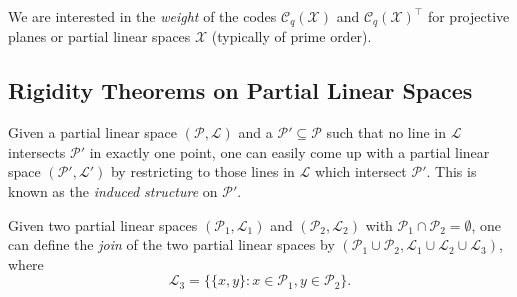 	We are interested in the \emph{weight} of the codes $\mathcal{C}_q(\mathcal{X})$ and $\mathcal{C}_q(\mathcal{X})^\top$ for projective planes or partial linear spaces $\mathcal{X}$ (typically of prime order).

\subsection{Rigidity Theorems on Partial Linear Spaces}

	\begin{fdef}
		Given a partial linear space $(\mathcal{P},\mathcal{L})$ and a $\mathcal{P}' \subseteq \mathcal{P}$ such that no line in $\mathcal{L}$ intersects $\mathcal{P}'$ in exactly one point, one can easily come up with a partial linear space $(\mathcal{P}',\mathcal{L}')$ by restricting to those lines in $\mathcal{L}$ which intersect $\mathcal{P}'$. This is known as the \emph{induced structure} on $\mathcal{P}'$.
	\end{fdef}

	\begin{fdef}[Join]
		Given two partial linear spaces $(\mathcal{P}_1,\mathcal{L}_1)$ and $(\mathcal{P}_2,\mathcal{L}_2)$ with $\mathcal{P}_1 \cap \mathcal{P}_2 = \emptyset$, one can define the \emph{join} of the two partial linear spaces by $(\mathcal{P}_1 \cup \mathcal{P}_2, \mathcal{L}_1\cup\mathcal{L}_2\cup\mathcal{L}_3)$, where
		\[ \mathcal{L}_3 = \{ \{x,y\} : x \in \mathcal{P}_1, y \in \mathcal{P}_2 \}. \]
	\end{fdef}

